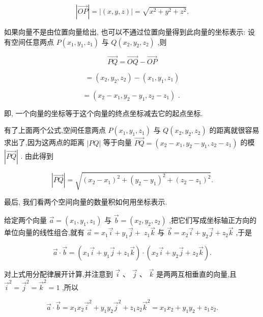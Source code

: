 \documentclass[10pt]{article}
\begin{document}
\[
\left| \overrightarrow{OP}\right|  = \left| \left( {x,y,z}\right) \right|  = \sqrt{{x}^{2} + {y}^{2} + {z}^{2}}.
\]

如果向量不是由位置向量给出, 也可以不通过位置向量得到此向量的坐标表示: 设有空间任意两点 \(P\left( {{x}_{1},{y}_{1},{z}_{1}}\right)\) 与 \(Q\left( {{x}_{2},{y}_{2},{z}_{2}}\right)\) ,则

\[
\overrightarrow{PQ} = \overrightarrow{OQ} - \overrightarrow{OP}
\]

\[
= \left( {{x}_{2},{y}_{2},{z}_{2}}\right)  - \left( {{x}_{1},{y}_{1},{z}_{1}}\right)
\]

\[
= \left( {{x}_{2} - {x}_{1},{y}_{2} - {y}_{1},{z}_{2} - {z}_{1}}\right) \text{ . }
\]

即, 一个向量的坐标等于这个向量的终点坐标减去它的起点坐标.

有了上面两个公式,空间任意两点 \(P\left( {{x}_{1},{y}_{1},{z}_{1}}\right)\) 与 \(Q\left( {{x}_{2},{y}_{2},{z}_{2}}\right)\) 的距离就很容易求出了,因为这两点的距离 \(\left| {PQ}\right|\) 等于向量 \(\overrightarrow{PQ} = \left( {{x}_{2} - {x}_{1},{y}_{2} - {y}_{1},{z}_{2} - {z}_{1}}\right)\) 的模 \(\left| \overrightarrow{PQ}\right|\) . 由此得到

\[
\left| \overrightarrow{PQ}\right|  = \sqrt{{\left( {x}_{2} - {x}_{1}\right) }^{2} + {\left( {y}_{2} - {y}_{1}\right) }^{2} + {\left( {z}_{2} - {z}_{1}\right) }^{2}}.
\]

最后, 我们看两个空间向量的数量积如何用坐标表示.

给定两个向量 \(\overrightarrow{a} = \left( {{x}_{1},{y}_{1},{z}_{1}}\right)\) 与 \(\overrightarrow{b} = \left( {{x}_{2},{y}_{2},{z}_{2}}\right)\) ,把它们写成坐标轴正方向的单位向量的线性组合,就有 \(\overrightarrow{a} = {x}_{1}\overrightarrow{i} + {y}_{1}\overrightarrow{j} + \; {z}_{1}\overrightarrow{k}\) 与 \(\overrightarrow{b} = {x}_{2}\overrightarrow{i} + {y}_{2}\overrightarrow{j} + {z}_{2}\overrightarrow{k}\) ,于是

\[
\overrightarrow{a} \cdot  \overrightarrow{b} = \left( {{x}_{1}\overrightarrow{i} + {y}_{1}\overrightarrow{j} + {z}_{1}\overrightarrow{k}}\right)  \cdot  \left( {{x}_{2}\overrightarrow{i} + {y}_{2}\overrightarrow{j} + {z}_{2}\overrightarrow{k}}\right) .
\]

对上式用分配律展开计算,并注意到 \(\overrightarrow{i}\text{ 、 }\overrightarrow{j}\text{ 、 }\overrightarrow{k}\) 是两两互相垂直的向量,且 \({\overrightarrow{i}}^{2} = {\overrightarrow{j}}^{2} = {\overrightarrow{k}}^{2} = 1\) ,所以

\[
\overrightarrow{a} \cdot  \overrightarrow{b} = {x}_{1}{x}_{2}{\overrightarrow{i}}^{2} + {y}_{1}{y}_{2}{\overrightarrow{j}}^{2} + {z}_{1}{z}_{2}{\overrightarrow{k}}^{2} = {x}_{1}{x}_{2} + {y}_{1}{y}_{2} + {z}_{1}{z}_{2}.
\]
\end{document}
